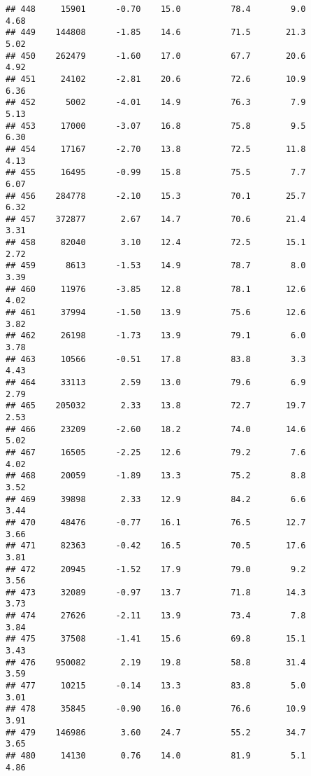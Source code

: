 \documentclass[
]{article}
\begin{document}
\begin{verbatim}
## 448     15901      -0.70    15.0          78.4        9.0              4.68
## 449    144808      -1.85    14.6          71.5       21.3              5.02
## 450    262479      -1.60    17.0          67.7       20.6              4.92
## 451     24102      -2.81    20.6          72.6       10.9              6.36
## 452      5002      -4.01    14.9          76.3        7.9              5.13
## 453     17000      -3.07    16.8          75.8        9.5              6.30
## 454     17167      -2.70    13.8          72.5       11.8              4.13
## 455     16495      -0.99    15.8          75.5        7.7              6.07
## 456    284778      -2.10    15.3          70.1       25.7              6.32
## 457    372877       2.67    14.7          70.6       21.4              3.31
## 458     82040       3.10    12.4          72.5       15.1              2.72
## 459      8613      -1.53    14.9          78.7        8.0              3.39
## 460     11976      -3.85    12.8          78.1       12.6              4.02
## 461     37994      -1.50    13.9          75.6       12.6              3.82
## 462     26198      -1.73    13.9          79.1        6.0              3.78
## 463     10566      -0.51    17.8          83.8        3.3              4.43
## 464     33113       2.59    13.0          79.6        6.9              2.79
## 465    205032       2.33    13.8          72.7       19.7              2.53
## 466     23209      -2.60    18.2          74.0       14.6              5.02
## 467     16505      -2.25    12.6          79.2        7.6              4.02
## 468     20059      -1.89    13.3          75.2        8.8              3.52
## 469     39898       2.33    12.9          84.2        6.6              3.44
## 470     48476      -0.77    16.1          76.5       12.7              3.66
## 471     82363      -0.42    16.5          70.5       17.6              3.81
## 472     20945      -1.52    17.9          79.0        9.2              3.56
## 473     32089      -0.97    13.7          71.8       14.3              3.73
## 474     27626      -2.11    13.9          73.4        7.8              3.84
## 475     37508      -1.41    15.6          69.8       15.1              3.43
## 476    950082       2.19    19.8          58.8       31.4              3.59
## 477     10215      -0.14    13.3          83.8        5.0              3.01
## 478     35845      -0.90    16.0          76.6       10.9              3.91
## 479    146986       3.60    24.7          55.2       34.7              3.65
## 480     14130       0.76    14.0          81.9        5.1              4.86

\end{verbatim}
\end{document}
